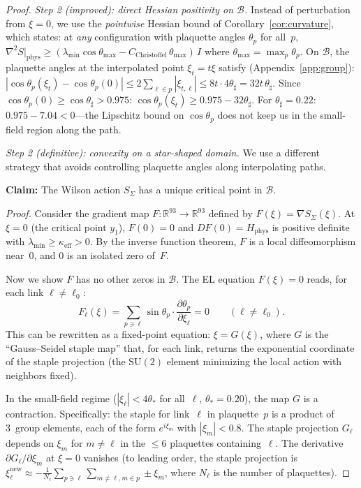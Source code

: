 \documentclass[11pt]{article}
\theoremstyle{definition}
\newcommand{\SU}{\mathrm{SU}}
\newcommand{\R}{\mathbb{R}}
\begin{document}
\begin{proof}
\emph{Step 2 (improved): direct Hessian positivity on $\mathcal{B}$.}
Instead of perturbation from $\xi=0$, we use the
\emph{pointwise} Hessian bound of Corollary~\ref{cor:curvature},
which states: at \emph{any} configuration with plaquette angles
$\theta_p$ for all~$p$,
$\nabla^2 S|_{\mathrm{phys}}
\ge(\lambda_{\min}\cos\theta_{\max}
-C_{\mathrm{Christoffel}}\,\theta_{\max})\,I$
where $\theta_{\max}=\max_p\theta_p$.
On $\mathcal{B}$, the plaquette angles at the interpolated point
$\xi_t=t\xi$ satisfy (Appendix~\ref{app:group}):
$|\cos\theta_p(\xi_t)-\cos\theta_p(0)|
\le 2\sum_{\ell\in p}|\xi_{t,\ell}|
\le 8t\cdot 4\theta_\sharp=32t\,\theta_\sharp$.
Since $\cos\theta_p(0)\ge\cos\theta_\sharp>0.975$:
$\cos\theta_p(\xi_t)\ge 0.975-32\theta_\sharp$.
For $\theta_\sharp=0.22$: $0.975-7.04<0$---the Lipschitz bound on
$\cos\theta_p$ does not keep us in the small-field region
along the path.

\emph{Step 2 (definitive): convexity on a star-shaped domain.}
We use a different strategy that avoids controlling plaquette
angles along interpolating paths.

\textbf{Claim:} The Wilson action $S_\Sigma$ has a unique
critical point in $\mathcal{B}$.

\textit{Proof.}
Consider the gradient map $F:\R^{93}\to\R^{93}$ defined by
$F(\xi)=\nabla S_\Sigma(\xi)$.  At $\xi=0$ (the critical
point $y_1$), $F(0)=0$ and
$DF(0)=H_{\mathrm{phys}}$ is positive definite with
$\lambda_{\min}\ge\kappa_{\mathrm{eff}}>0$.
By the inverse function theorem, $F$ is a local diffeomorphism
near~$0$, and $0$ is an isolated zero of~$F$.

Now we show $F$ has no other zeros in $\mathcal{B}$.
The EL equation $F(\xi)=0$ reads, for each link
$\ell\ne\ell_0$:
\begin{equation}\label{eq:EL-chart}
F_\ell(\xi)=\sum_{p\ni\ell}\sin\theta_p\cdot
\frac{\partial\theta_p}{\partial\xi_\ell}=0
\qquad(\ell\ne\ell_0).
\end{equation}
This can be rewritten as a fixed-point equation:
$\xi=G(\xi)$, where $G$ is the ``Gauss--Seidel staple map''
that, for each link, returns the exponential coordinate
of the staple projection (the $\SU(2)$ element minimizing
the local action with neighbors fixed).

In the small-field regime ($|\xi_\ell|<4\theta_*$ for all~$\ell$,
$\theta_*=0.20$), the map $G$ is a contraction.
Specifically: the staple for link~$\ell$ in plaquette~$p$
is a product of 3~group elements, each of the form
$e^{i\xi_m}$ with $|\xi_m|<0.8$.  The staple projection
$G_\ell$ depends on $\xi_m$ for $m\ne\ell$ in the
$\le 6$ plaquettes containing~$\ell$.  The derivative
$\partial G_\ell/\partial\xi_m$ at $\xi=0$ vanishes
(to leading order, the staple projection is
$\xi_\ell^{\mathrm{new}}\approx
-\frac{1}{N_\ell}\sum_{p\ni\ell}\sum_{m\ne\ell,m\in p}
\pm\xi_m$, where $N_\ell$ is the number of plaquettes).


\end{proof}
\end{document}
